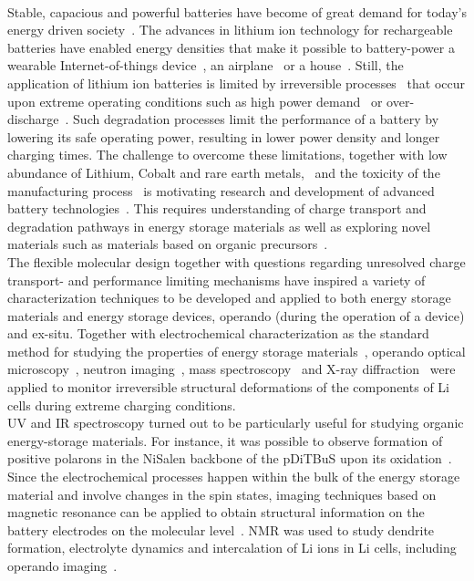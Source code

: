 \paragraph*{}
Stable, capacious and powerful batteries have become of great demand for today's energy driven society~\cite{Yoo2014,Xu2020,Nitta2015}. The advances in lithium ion technology for rechargeable batteries have enabled energy densities that make it possible to battery-power a wearable Internet-of-things device~\cite{Lee2013,Maddikunta2020}, an airplane~\cite{Kadlec2014} or a house~\cite{Diouf2019,Hirasawa2021}. Still, the application of lithium ion batteries is limited by irreversible processes~\cite{Larsson2017,Fu2015,Zhang2021} that occur upon extreme operating conditions such as high power demand~\cite{Zhang2022,Guan2018} or over-discharge~\cite{Ma2020}. Such degradation processes limit the performance of a battery by lowering its safe operating power, resulting in lower power density and longer charging times. The challenge to overcome these limitations, together with low abundance of Lithium, Cobalt and rare earth metals,~\cite{Xu2020,janoschka2012_advmater} and the toxicity of the manufacturing process~\cite{Prazanov2022,Peters2017} is motivating research and development of advanced battery technologies~\cite{Degen2022}. This requires understanding of charge transport and degradation pathways in energy storage materials as well as exploring novel materials such as materials based on organic precursors~\cite{Lu2020,Kim2023}.\\

The flexible molecular design together with questions regarding unresolved charge transport- and performance limiting mechanisms have inspired a variety of characterization techniques to be developed and applied to both energy storage materials and energy storage devices, operando (during the operation of a device) and ex-situ. Together with electrochemical characterization as the standard method for studying the properties of energy storage materials~\cite{IWASA2007,Zens2022}, operando optical microscopy~\cite{Merryweather2022}, neutron imaging~\cite{Ma2020}, mass spectroscopy~\cite{Fang_2021} and X-ray diffraction~\cite{Rhodes2012} were applied to monitor irreversible structural deformations of the components of Li cells during extreme charging conditions.\\

UV and IR spectroscopy turned out to be particularly useful for studying organic energy-storage materials. For instance, it was possible to observe formation of positive polarons in the NiSalen backbone of the pDiTBuS upon its oxidation~\cite{Dmitrieva2018}.
Since the electrochemical processes happen within the bulk of the energy storage material and involve changes in the spin states, imaging techniques based on magnetic resonance can be applied to obtain structural information on the battery electrodes on the molecular level~\cite{Niemoller2018,Meier2013,Li2019,Bittl2005}. NMR was used to study dendrite formation, electrolyte dynamics and intercalation of Li ions\cite{Kushida1980,Grosu2023a} in Li cells, including operando imaging~\cite{Shi2019}.\\ 

